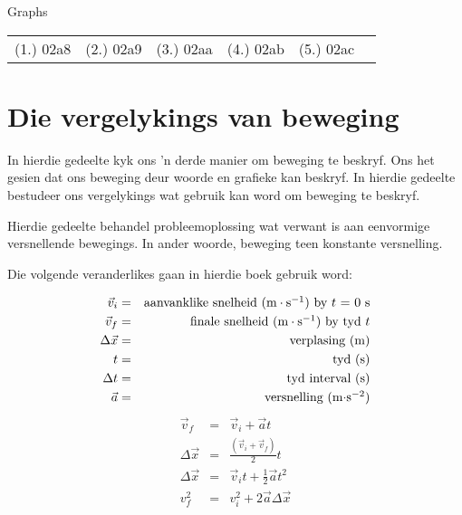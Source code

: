 \begin{exercises}{Graphs}
\par \practiceinfo
\par \begin{tabular}[h]{cccccc}
(1.)	02a8	&
(2.)	02a9	&
(3.)	02aa	&
(4.)	02ab	&
(5.)	02ac	&
\end{tabular}
\end{exercises}


\section{Die vergelykings van beweging}
    \nopagebreak
      
In hierdie gedeelte kyk ons 'n derde manier om beweging te beskryf. Ons het gesien dat ons beweging deur woorde en grafieke kan beskryf. In hierdie gedeelte bestudeer ons vergelykings wat gebruik kan word om beweging te beskryf.\par

Hierdie gedeelte behandel probleemoplossing wat verwant is aan eenvormige versnellende bewegings. In ander woorde, beweging teen konstante versnelling.

Die volgende veranderlikes gaan in hierdie boek gebruik word:\par      
      
\label{m38796*id75611}\nopagebreak\noindent{}
\begin{eqnarray*}
\vec{v}_i &=& \mbox{aanvanklike snelheid ($\text{m}\cdot\text{s}^{-1}$) by $t$ = 0 s} \\
\vec{v}_f &=& \mbox{finale snelheid ($\text{m}\cdot\text{s}^{-1}$) by tyd $t$}\\
\Delta \vec{x} &=& \mbox{verplasing (m)} \\
t &=& \mbox{tyd (s)} \\
\Delta t &=& \mbox{tyd interval (s)} \\
\vec{a} &=& \mbox{versnelling (m$\cdot$s$^{-2}$)}
\end{eqnarray*}
      \label{m38796*eip-506}\nopagebreak\noindent{}
\begin{eqnarray}
\vec{v}_f &=& \vec{v}_i + \vec{a}t \label{eq:eq1}\\
\Delta \vec{x} &=& \frac{(\vec{v}_i + \vec{v}_f)}{2} t\label{eq:eq2}\\
\Delta \vec{x} &=& \vec{v}_it + \frac{1}{2}\vec{a}t^2 \label{eq:eq3}\\
v_f^2 &=& v_i^2 + 2\vec{a} \Delta \vec{x} \label{eq:eq4}
\end{eqnarray}

